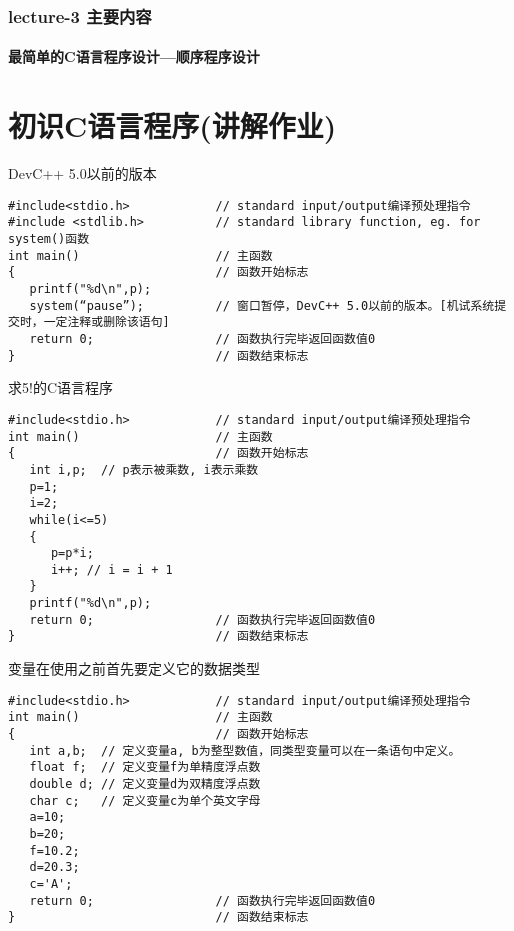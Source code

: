 \begin{frame}
  \frametitle{lecture-3 主要内容}
  \framesubtitle{最简单的C语言程序设计---顺序程序设计}
  \tableofcontents[hideallsubsections]
\end{frame}

\section{初识C语言程序(讲解作业)}

\begin{frame}[fragile]{DevC++ 5.0以前的版本}
\begin{lstlisting}
#include<stdio.h>            // standard input/output编译预处理指令
#include <stdlib.h>          // standard library function, eg. for system()函数 
int main()                   // 主函数
{                            // 函数开始标志
   printf("%d\n",p);
   system(“pause”);          // 窗口暂停，DevC++ 5.0以前的版本。[机试系统提交时，一定注释或删除该语句] 
   return 0;                 // 函数执行完毕返回函数值0
}                            // 函数结束标志
\end{lstlisting}
\end{frame}

\begin{frame}[fragile]{求5!的C语言程序}
\begin{lstlisting}
#include<stdio.h>            // standard input/output编译预处理指令
int main()                   // 主函数
{                            // 函数开始标志
   int i,p;  // p表示被乘数, i表示乘数
   p=1;
   i=2;
   while(i<=5)
   {  
      p=p*i;
      i++; // i = i + 1
   }
   printf("%d\n",p);
   return 0;                 // 函数执行完毕返回函数值0
}                            // 函数结束标志
\end{lstlisting}
\end{frame}

\begin{frame}[fragile]{变量在使用之前首先要定义它的数据类型}
\begin{lstlisting}
#include<stdio.h>            // standard input/output编译预处理指令
int main()                   // 主函数
{                            // 函数开始标志
   int a,b;  // 定义变量a, b为整型数值，同类型变量可以在一条语句中定义。
   float f;  // 定义变量f为单精度浮点数
   double d; // 定义变量d为双精度浮点数
   char c;   // 定义变量c为单个英文字母
   a=10;
   b=20;
   f=10.2;
   d=20.3;
   c='A';
   return 0;                 // 函数执行完毕返回函数值0
}                            // 函数结束标志
\end{lstlisting}
\end{frame}

